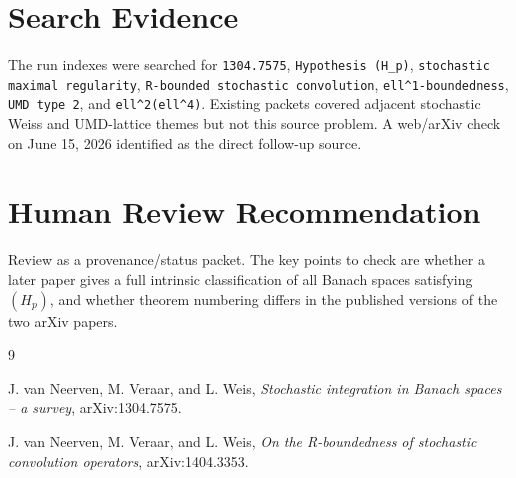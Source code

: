 \documentclass[11pt]{article}
\begin{document}
\section*{Search Evidence}

The run indexes were searched for \texttt{1304.7575}, \texttt{Hypothesis
(H\_p)}, \texttt{stochastic maximal regularity}, \texttt{R-bounded stochastic
convolution}, \texttt{ell\^{}1-boundedness}, \texttt{UMD type 2}, and
\texttt{ell\^{}2(ell\^{}4)}. Existing packets covered adjacent stochastic
Weiss and UMD-lattice themes but not this source problem. A web/arXiv check on
June 15, 2026 identified \cite{NVWrbounded} as the direct follow-up source.

\section*{Human Review Recommendation}

Review as a provenance/status packet. The key points to check are whether a
later paper gives a full intrinsic classification of all Banach spaces
satisfying $(H_p)$, and whether theorem numbering differs in the published
versions of the two arXiv papers.

\begin{thebibliography}{9}

J. van Neerven, M. Veraar, and L. Weis,
\emph{Stochastic integration in Banach spaces -- a survey},
arXiv:1304.7575.

J. van Neerven, M. Veraar, and L. Weis,
\emph{On the R-boundedness of stochastic convolution operators},
arXiv:1404.3353.

\end{thebibliography}
\end{document}
